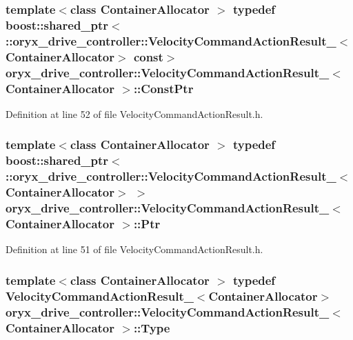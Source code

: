 \subsubsection[{\-Const\-Ptr}]{\setlength{\rightskip}{0pt plus 5cm}template$<$class Container\-Allocator $>$ typedef boost\-::shared\-\_\-ptr$<$ \-::{\bf oryx\-\_\-drive\-\_\-controller\-::\-Velocity\-Command\-Action\-Result\-\_\-}$<$\-Container\-Allocator$>$ const$>$ {\bf oryx\-\_\-drive\-\_\-controller\-::\-Velocity\-Command\-Action\-Result\-\_\-}$<$ \-Container\-Allocator $>$\-::{\bf \-Const\-Ptr}}\label{structoryx__drive__controller_1_1VelocityCommandActionResult___aa58fb8561c238414ab575a7f40e6a194}


\-Definition at line 52 of file \-Velocity\-Command\-Action\-Result.\-h.

\subsubsection[{\-Ptr}]{\setlength{\rightskip}{0pt plus 5cm}template$<$class Container\-Allocator $>$ typedef boost\-::shared\-\_\-ptr$<$ \-::{\bf oryx\-\_\-drive\-\_\-controller\-::\-Velocity\-Command\-Action\-Result\-\_\-}$<$\-Container\-Allocator$>$ $>$ {\bf oryx\-\_\-drive\-\_\-controller\-::\-Velocity\-Command\-Action\-Result\-\_\-}$<$ \-Container\-Allocator $>$\-::{\bf \-Ptr}}\label{structoryx__drive__controller_1_1VelocityCommandActionResult___a3b955e260c57725f7a289d209c0ae223}


\-Definition at line 51 of file \-Velocity\-Command\-Action\-Result.\-h.

\subsubsection[{\-Type}]{\setlength{\rightskip}{0pt plus 5cm}template$<$class Container\-Allocator $>$ typedef {\bf \-Velocity\-Command\-Action\-Result\-\_\-}$<$\-Container\-Allocator$>$ {\bf oryx\-\_\-drive\-\_\-controller\-::\-Velocity\-Command\-Action\-Result\-\_\-}$<$ \-Container\-Allocator $>$\-::{\bf \-Type}}\label{structoryx__drive__controller_1_1VelocityCommandActionResult___a2d4cd08f901dccdef0eab370316ced6b}


